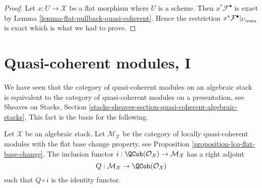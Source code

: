 \begin{proof}
Let $x : U \to \mathcal{X}$ be a flat morphism where $U$ is a scheme.
Then $x^*\mathcal{F}^\bullet$ is exact by
Lemma \ref{lemma-flat-pullback-quasi-coherent}.
Hence the restriction $x^*\mathcal{F}^\bullet|_{U_\etale}$
is exact which is what we had to prove.
\end{proof}





\section{Quasi-coherent modules, I}
\label{section-quasi-coherent}

\noindent
We have seen that the category of quasi-coherent modules on an algebraic
stack is equivalent to the category of quasi-coherent modules on a
presentation, see
Sheaves on Stacks, Section
\ref{stacks-sheaves-section-quasi-coherent-algebraic-stacks}.
This fact is the basis for the following.

\begin{lemma}
\label{lemma-adjoint}
Let $\mathcal{X}$ be an algebraic stack. Let $\mathcal{M}_\mathcal{X}$
be the category of locally quasi-coherent modules with the
flat base change property, see
Proposition \ref{proposition-lcq-flat-base-change}.
The inclusion functor
$i : \QCoh(\mathcal{O}_\mathcal{X}) \to \mathcal{M}_\mathcal{X}$
has a right adjoint
$$
Q : \mathcal{M}_\mathcal{X} \to \QCoh(\mathcal{O}_\mathcal{X})
$$
such that $Q \circ i$ is the identity functor.
\end{lemma}

